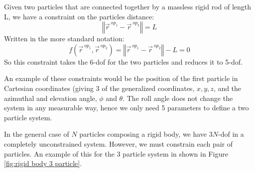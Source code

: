 \documentclass[12pt]{report}
\begin{document}
Given two particles that are connected together by a massless rigid rod of length L, we have a constraint on the particles distance:
$$\left\Vert \vec{r}^{\ op_1}-\vec{r}^{\ op_2}\right\Vert=L$$
Written in the more standard notation:
$$f\left(\vec{r}^{\ op_1},\vec{r}^{\ op_2}\right)=\left\Vert \vec{r}^{\ op_1}-\vec{r}^{\ op_2}\right\Vert-L=0$$
So this constraint takes the 6-\gls{dof} for the two particles and reduces it to 5-\gls{dof}.

An example of these constraints would be the position of the first particle in Cartesian coordinates (giving 3 of the generalized coordinates, $x,y,z$, and the azimuthal and elevation angle, $\phi$ and $\theta$. The roll angle does not change the system in any measurable way, hence we only need 5 parameters to define a two particle system.

In the general case of $N$ particles composing a \gls{rigid body}, we have $3N$-\gls{dof} in a completely unconstrained system. However, we must constrain each pair of particles. An example of this for the 3 particle system in shown in Figure \ref{fig:rigid body 3 particle}.
\end{document}
